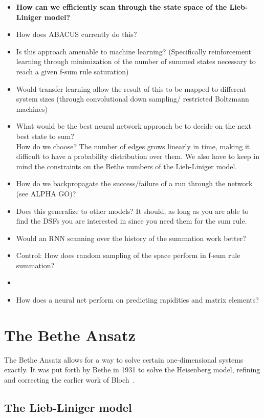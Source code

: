 \documentclass[11pt, a4paper]{report} %
\begin{document}
\begin{itemize}
  \item \textbf{How can we efficiently scan through the state space of the Lieb-Liniger model?}
  \item How does ABACUS currently do this?
  \item Is this approach amenable to machine learning? (Specifically reinforcement learning through minimization of the number of summed states necessary to reach a given f-sum rule saturation)
  \item Would transfer learning allow the result of this to be mapped to different system sizes (through convolutional down sampling/ restricted Boltzmann machines)
  \item What would be the best neural network approach be to decide on the next best state to sum? \\ How do we choose? The number of edges grows linearly in time, making it difficult to have a probability distribution over them. We also have to keep in mind the constraints on the Bethe numbers of the Lieb-Liniger model.    
  \item How do we backpropagate the success/failure of a run through the network (see ALPHA GO)?
  \item Does this generalize to other models? It should, as long as you are able to find the DSFs you are interested in since you need them for the sum rule.
  \item Would an RNN scanning over the history of the summation work better?
  \item Control: How does random sampling of the space perform in f-sum rule summation?
  \item
  \item How does a neural net perform on predicting rapidities and matrix elements?
\end{itemize}

\chapter{The Bethe Ansatz}\label{chap:bethe_ansatz}

The Bethe Ansatz allows for a way to solve certain one-dimensional systems exactly.
It was put forth by Bethe in 1931 to solve the Heisenberg model, refining and correcting the earlier work of Bloch~\cite{Bethe1931}.

\section{The Lieb-Liniger model}
\end{document}
